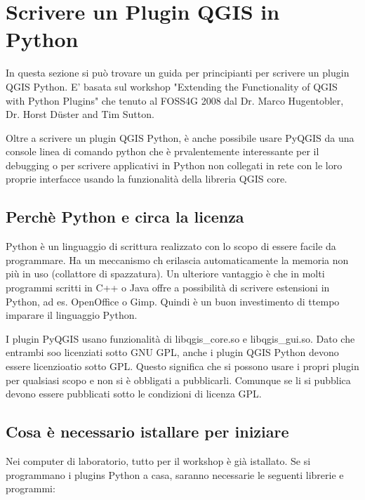 
\section{Scrivere un Plugin QGIS in Python}


In questa sezione si può trovare un guida per principianti per scrivere un plugin QGIS Python. E' basata sul workshop "Extending the Functionality of QGIS
with Python Plugins" che tenuto al FOSS4G 2008 dal Dr. Marco Hugentobler, Dr. Horst
D\"uster and Tim Sutton. 

Oltre a scrivere un plugin QGIS Python, è anche possibile usare PyQGIS da una console linea di comando python che è prvalentemente interessante per il debugging o per scrivere applicativi in Python non collegati in rete con le loro proprie interfacce usando la funzionalità della libreria QGIS core.

\subsection{Perchè Python e circa la licenza}

Python è un linguaggio di scrittura realizzato con lo scopo di essere facile da programmare. Ha un meccanismo ch erilascia automaticamente la memoria non più in uso (collattore di spazzatura). Un ulteriore vantaggio è che in molti programmi scritti in C++ o Java offre a possibilità di scrivere estensioni in Python, ad es. OpenOffice o Gimp. Quindi è un buon investimento di ttempo imparare il linguaggio Python.

I plugin PyQGIS usano funzionalità di libqgis\_core.so e libqgis\_gui.so. Dato che entrambi soo licenziati sotto GNU GPL, anche i plugin QGIS Python devono essere licenzioatio sotto GPL. Questo significa che si possono usare i propri plugin per qualsiasi scopo e non si è obbligati a pubblicarli. Comunque se li si pubblica devono essere pubblicati sotto le condizioni di licenza GPL.

\subsection{Cosa è necessario istallare per iniziare}

Nei computer di laboratorio, tutto per il workshop è già istallato. Se si programmano i plugins Python a casa, saranno necessarie le seguenti librerie e programmi:

